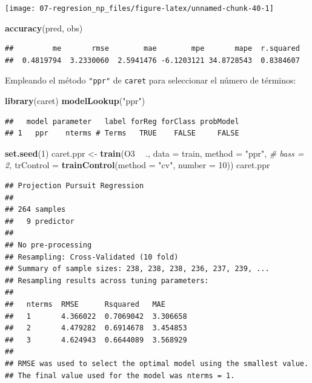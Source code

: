 \documentclass[
  spanish,
]{book}
\newenvironment{Shaded}{\begin{snugshade}}{\end{snugshade}}
\newcommand{\CommentTok}[1]{\textcolor[rgb]{0.56,0.35,0.01}{\textit{#1}}}
\newcommand{\DataTypeTok}[1]{\textcolor[rgb]{0.13,0.29,0.53}{#1}}
\newcommand{\DecValTok}[1]{\textcolor[rgb]{0.00,0.00,0.81}{#1}}
\newcommand{\KeywordTok}[1]{\textcolor[rgb]{0.13,0.29,0.53}{\textbf{#1}}}
\newcommand{\NormalTok}[1]{#1}
\newcommand{\OperatorTok}[1]{\textcolor[rgb]{0.81,0.36,0.00}{\textbf{#1}}}
\newcommand{\StringTok}[1]{\textcolor[rgb]{0.31,0.60,0.02}{#1}}
\theoremstyle{break}
\theoremstyle{definition}
\theoremstyle{definition}
\theoremstyle{definition}
\theoremstyle{remark}
\begin{document}
\begin{center}\texttt{[image: 07-regresion\_np\_files/figure-latex/unnamed-chunk-40-1]} \end{center}

\begin{Shaded}
\begin{Highlighting}[]
\KeywordTok{accuracy}\NormalTok{(pred, obs)}
\end{Highlighting}
\end{Shaded}

\begin{verbatim}
##         me       rmse        mae        mpe       mape  r.squared 
##  0.4819794  3.2330060  2.5941476 -6.1203121 34.8728543  0.8384607
\end{verbatim}

Empleando el método \texttt{"ppr"} de \texttt{caret} para seleccionar el número de términos:

\begin{Shaded}
\begin{Highlighting}[]
\KeywordTok{library}\NormalTok{(caret)}
\KeywordTok{modelLookup}\NormalTok{(}\StringTok{"ppr"}\NormalTok{)}
\end{Highlighting}
\end{Shaded}

\begin{verbatim}
##   model parameter   label forReg forClass probModel
## 1   ppr    nterms # Terms   TRUE    FALSE     FALSE
\end{verbatim}

\begin{Shaded}
\begin{Highlighting}[]
\KeywordTok{set.seed}\NormalTok{(}\DecValTok{1}\NormalTok{)}
\NormalTok{caret.ppr <-}\StringTok{ }\KeywordTok{train}\NormalTok{(O3 }\OperatorTok{~}\StringTok{ }\NormalTok{., }\DataTypeTok{data =}\NormalTok{ train, }\DataTypeTok{method =} \StringTok{"ppr"}\NormalTok{, }\CommentTok{# bass = 2,}
    \DataTypeTok{trControl =} \KeywordTok{trainControl}\NormalTok{(}\DataTypeTok{method =} \StringTok{"cv"}\NormalTok{, }\DataTypeTok{number =} \DecValTok{10}\NormalTok{))}
\NormalTok{caret.ppr}
\end{Highlighting}
\end{Shaded}

\begin{verbatim}
## Projection Pursuit Regression 
## 
## 264 samples
##   9 predictor
## 
## No pre-processing
## Resampling: Cross-Validated (10 fold) 
## Summary of sample sizes: 238, 238, 238, 236, 237, 239, ... 
## Resampling results across tuning parameters:
## 
##   nterms  RMSE      Rsquared   MAE     
##   1       4.366022  0.7069042  3.306658
##   2       4.479282  0.6914678  3.454853
##   3       4.624943  0.6644089  3.568929
## 
## RMSE was used to select the optimal model using the smallest value.
## The final value used for the model was nterms = 1.
\end{verbatim}
\end{document}
